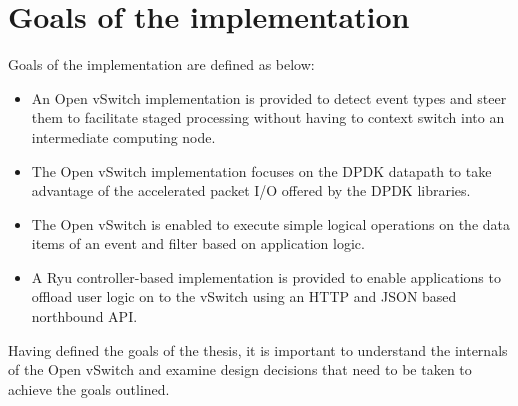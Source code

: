 \section{Goals of the implementation}
Goals of the implementation are defined as below:
\begin{itemize}
\item An Open vSwitch implementation is provided to detect event types and steer them to facilitate staged processing without having to context switch into an intermediate computing node.
\item The Open vSwitch implementation focuses on the DPDK datapath to take advantage of the accelerated packet I/O offered by the DPDK libraries.
\item The Open vSwitch is enabled to execute simple logical operations on the data items of an event and filter based on application logic. 
\item A Ryu controller-based implementation is provided to enable applications to offload user logic on to the vSwitch using an HTTP and JSON based northbound API.
\end{itemize}
Having defined the goals of the thesis, it is important to understand the internals of the Open vSwitch and examine design decisions that need to be taken to achieve the goals outlined.

